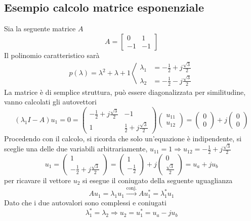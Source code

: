 
\subsection{Esempio calcolo matrice esponenziale}
Sia la seguente matrice $A$
$$
A = \begin{bmatrix}
0 & 1\\
-1 & -1
\end{bmatrix}
$$
Il polinomio caratteristico sarà
$$
p(\lambda) = \lambda^2 + \lambda +1 \left\langle \begin{aligned}
\lambda_1 &= -\frac{1}{2} + j\frac{\sqrt{3}}{2} \\
\lambda_2 &= -\frac{1}{2} -j\frac{\sqrt{3}}{2}
\end{aligned}\right.
$$
La matrice è di semplice struttura, può essere diagonalizzata per similitudine,
vanno calcolati gli autovettori
$$
(\lambda_1I-A)u_1 = 0 =\begin{pmatrix}
-\frac{1}{2} + j\frac{\sqrt{3}}{2} & -1 \\
1 & \frac{1}{2} + j\frac{\sqrt{3}}{2}
\end{pmatrix}\begin{pmatrix}
u_{11} \\ u_{12}
\end{pmatrix} = \begin{pmatrix}
0 \\0
\end{pmatrix} +j\begin{pmatrix}
0 \\ 0
\end{pmatrix}
$$
Procedendo con il calcolo, si ricorda che solo un'equazione è indipendente, si
sceglie una delle due variabili arbitrariamente, $u_{11} = 1\Rightarrow u_{12}
= -\frac{1}{2} + j\frac{\sqrt{3}}{2}$
$$
u_1 = \begin{pmatrix}
1 \\ -\frac{1}{2}+j\frac{\sqrt{3}}{2}
\end{pmatrix} = \begin{pmatrix}
1 \\ -\frac{1}{2}
\end{pmatrix} + j\begin{pmatrix}
0 \\ \frac{\sqrt{3}}{2}
\end{pmatrix} = u_a + ju_b
$$
per ricavare il vettore $u_2$ si esegue il coniugato della seguente uguaglianza
$$
Au_1 = \lambda_1u_1 \stackrel{\text{conj.}}{\longrightarrow}Au_1^* =
\lambda_1^* u_1
$$
Dato che i due autovalori sono complessi e coniugati
$$
\lambda_1^* = \lambda_2 \Rightarrow u_2 = u_1^* = u_a -ju_b
$$

